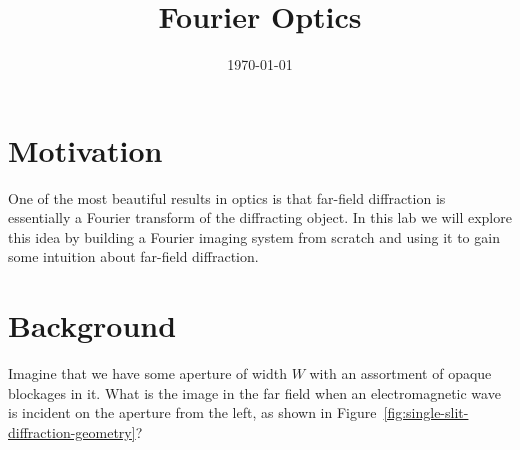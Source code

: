 \documentclass[]{manual}
\title{Fourier Optics}
\date{\today}
\begin{document}
    \maketitle
    \thispagestyle{firstpage}


    \section{Motivation}

    One of the most beautiful results in optics is that far-field diffraction is essentially a Fourier transform of the diffracting object.
    In this lab we will explore this idea by building a Fourier imaging system from scratch and using it to gain some intuition about far-field diffraction.

    \section{Background}

    Imagine that we have some aperture of width $W$ with an assortment of opaque blockages in it.
    What is the image in the far field when an electromagnetic wave is incident on the aperture from the left, as shown in Figure~\ref{fig:single-slit-diffraction-geometry}?
\end{document}
